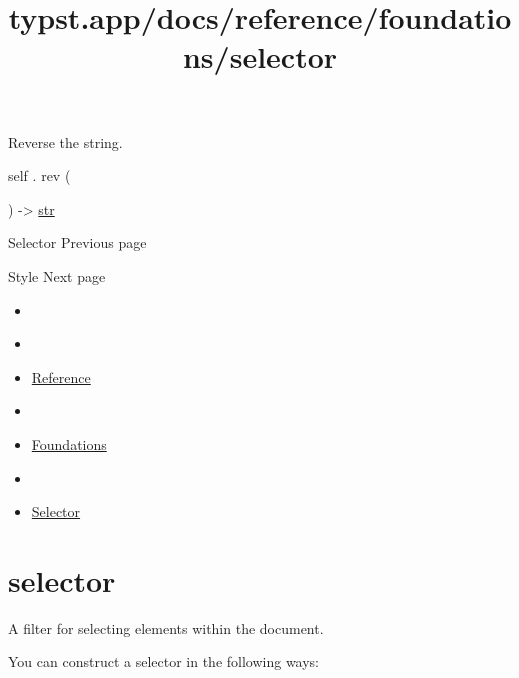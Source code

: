 Reverse the string.

self { . } { rev } (

) -\textgreater{} \href{/docs/reference/foundations/str/}{str}

\href{/docs/reference/foundations/selector/}{\pandocbounded{}}

{ Selector } { Previous page }

\href{/docs/reference/foundations/style/}{\pandocbounded{}}

{ Style } { Next page }


\title{typst.app/docs/reference/foundations/selector}

\begin{itemize}
\tightlist
\item
  \href{/docs}{}
\item
  
\item
  \href{/docs/reference/}{Reference}
\item
  
\item
  \href{/docs/reference/foundations/}{Foundations}
\item
  
\item
  \href{/docs/reference/foundations/selector/}{Selector}
\end{itemize}

\section{\texorpdfstring{{ selector }}{ selector }}\label{summary}

A filter for selecting elements within the document.

You can construct a selector in the following ways:

